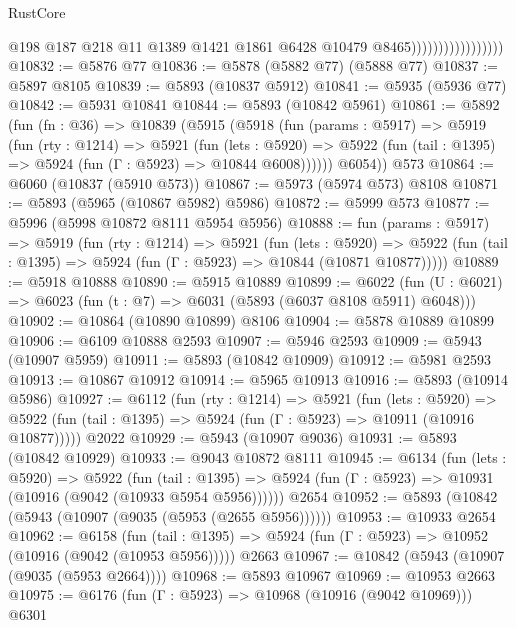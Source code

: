\begin{lexlean}{RustCore}
\begin{coremodule}
                                      @198
                                      @187
                                      @218
                                      @11
                                      @1389
                                      @1421
                                      @1861
                                      @6428
                                      @10479
                                      @8465)))))))))))))))))
@10832 := @5876 @77
@10836 := @5878 (@5882 @77) (@5888 @77)
@10837 := @5897 @8105
@10839 := @5893 (@10837 @5912)
@10841 := @5935 (@5936 @77)
@10842 := @5931 @10841
@10844 := @5893 (@10842 @5961)
@10861 := @5892
    (fun (fn : @36) =>
    @10839
      (@5915
        (@5918
          (fun (params : @5917) =>
          @5919
            (fun (rty : @1214) =>
            @5921
              (fun (lets : @5920) =>
              @5922 (fun (tail : @1395) => @5924 (fun (Γ : @5923) => @10844 @6008))))))
        @6054))
    @573
@10864 := @6060 (@10837 (@5910 @573))
@10867 := @5973 (@5974 @573) @8108
@10871 := @5893 (@5965 (@10867 @5982) @5986)
@10872 := @5999 @573
@10877 := @5996 (@5998 @10872 @8111 @5954 @5956)
@10888 := fun (params : @5917) =>
  @5919
    (fun (rty : @1214) =>
    @5921
      (fun (lets : @5920) =>
      @5922 (fun (tail : @1395) => @5924 (fun (Γ : @5923) => @10844 (@10871 @10877)))))
@10889 := @5918 @10888
@10890 := @5915 @10889
@10899 := @6022 (fun (U : @6021) => @6023 (fun (t : @7) => @6031 (@5893 (@6037 @8108 @5911) @6048)))
@10902 := @10864 (@10890 @10899) @8106
@10904 := @5878 @10889 @10899
@10906 := @6109 @10888 @2593
@10907 := @5946 @2593
@10909 := @5943 (@10907 @5959)
@10911 := @5893 (@10842 @10909)
@10912 := @5981 @2593
@10913 := @10867 @10912
@10914 := @5965 @10913
@10916 := @5893 (@10914 @5986)
@10927 := @6112
    (fun (rty : @1214) =>
    @5921
      (fun (lets : @5920) =>
      @5922 (fun (tail : @1395) => @5924 (fun (Γ : @5923) => @10911 (@10916 @10877)))))
    @2022
@10929 := @5943 (@10907 @9036)
@10931 := @5893 (@10842 @10929)
@10933 := @9043 @10872 @8111
@10945 := @6134
    (fun (lets : @5920) =>
    @5922
      (fun (tail : @1395) =>
      @5924 (fun (Γ : @5923) => @10931 (@10916 (@9042 (@10933 @5954 @5956))))))
    @2654
@10952 := @5893 (@10842 (@5943 (@10907 (@9035 (@5953 (@2655 @5956))))))
@10953 := @10933 @2654
@10962 := @6158
    (fun (tail : @1395) => @5924 (fun (Γ : @5923) => @10952 (@10916 (@9042 (@10953 @5956)))))
    @2663
@10967 := @10842 (@5943 (@10907 (@9035 (@5953 @2664))))
@10968 := @5893 @10967
@10969 := @10953 @2663
@10975 := @6176 (fun (Γ : @5923) => @10968 (@10916 (@9042 @10969))) @6301

\end{coremodule}
\end{lexlean}
